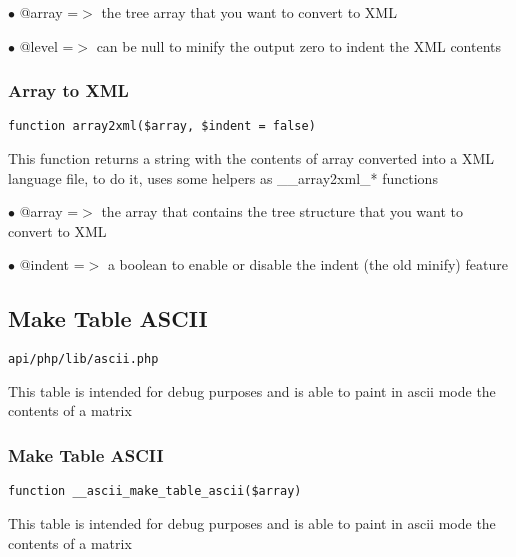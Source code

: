 \documentclass[a4paper]{article}
\begin{document}
\begin{compactitem}
\item[\color{myblue}$\bullet$] @array =$>$ the tree array that you want to convert to XML
\item[\color{myblue}$\bullet$] @level =$>$ can be null to minify the output zero to indent the XML contents
\end{compactitem}

\hypertarget{toc372}{}
\subsubsection{Array to XML}

\begin{lstlisting}
function array2xml($array, $indent = false)
\end{lstlisting}

This function returns a string with the contents of array converted into a XML
language file, to do it, uses some helpers as \_\_array2xml\_* functions

\begin{compactitem}
\item[\color{myblue}$\bullet$] @array  =$>$ the array that contains the tree structure that you want to convert to XML
\item[\color{myblue}$\bullet$] @indent =$>$ a boolean to enable or disable the indent (the old minify) feature
\end{compactitem}

\hypertarget{toc373}{}
\subsection{Make Table ASCII}

\begin{lstlisting}
api/php/lib/ascii.php
\end{lstlisting}

This table is intended for debug purposes and is able to paint in ascii
mode the contents of a matrix

\hypertarget{toc374}{}
\subsubsection{Make Table ASCII}

\begin{lstlisting}
function __ascii_make_table_ascii($array)
\end{lstlisting}

This table is intended for debug purposes and is able to paint in ascii
mode the contents of a matrix
\end{document}
